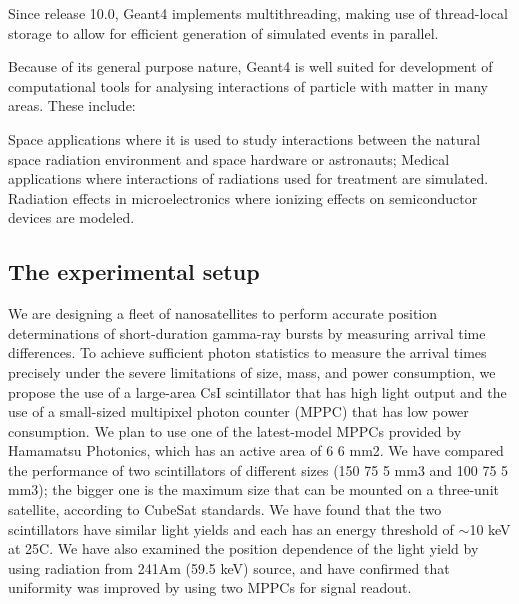 \documentclass[12pt, a4paper,titlepage]{article}
\numberwithin{equation}{section}
\numberwithin{figure}{section}
\begin{document}
Since release 10.0, Geant4 implements multithreading, making use of thread-local storage to allow for efficient generation of simulated events in parallel.

Because of its general purpose nature, Geant4 is well suited for development of computational tools for analysing interactions of particle with matter in many areas. These include:

Space applications where it is used to study interactions between the natural space radiation environment and space hardware or astronauts; Medical applications where interactions of radiations used for treatment are simulated. Radiation effects in microelectronics where ionizing effects on semiconductor devices are modeled.

\subsection{The experimental setup}


We are designing a fleet of nanosatellites to perform accurate position determinations
of short-duration gamma-ray bursts by measuring arrival time differences.
To achieve sufficient photon statistics to measure the arrival times
precisely under the severe limitations of size, mass, and power consumption,
we propose the use of a large-area CsI scintillator that has high light output
and the use of a small-sized multipixel photon counter (MPPC) that has low
power consumption. We plan to use one of the latest-model MPPCs provided
by Hamamatsu Photonics, which has an active area of 6  6 mm2. We have compared the performance of two scintillators of different sizes (150  75  5 mm3 and 100  75  5 mm3); the bigger one is the maximum size that can be mounted on a three-unit satellite, according to CubeSat standards.
We have found that the two scintillators have similar light yields and each has an energy threshold of $\sim$10 keV at 25C. We have also examined the position dependence of the light yield by using radiation from 241Am (59.5 keV) source, and have confirmed that uniformity was improved by using two MPPCs for signal readout. 
\end{document}
